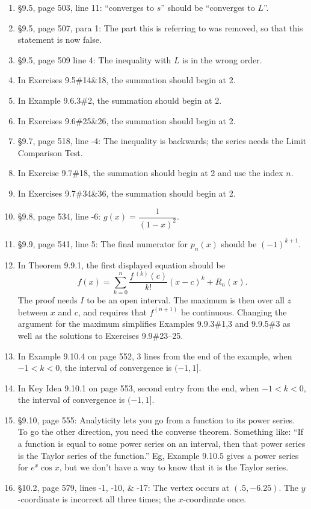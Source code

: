 \documentclass{amsart}
\begin{document}
\begin{enumerate}
\item \S9.5, page 503, line 11: ``converges to $s$'' should be ``converges to $L$''.
\item \S9.5, page 507, para 1: The part this is referring to was removed, so that this statement is now false.
\item \S9.5, page 509 line 4: The inequality with $L$ is in the wrong order.
\item In Exercises 9.5\#14\&18, the summation should begin at 2.
\item In Example 9.6.3\#2, the summation should begin at 2.
\item In Exercises 9.6\#25\&26, the summation should begin at 2.
\item \S9.7, page 518, line -4: The inequality is backwards; the series needs the Limit Comparison Test.
\item In Exercise 9.7\#18, the summation should begin at 2 and use the index $n$.
\item In Exercises 9.7\#34\&36, the summation should begin at 2.
\item \S9.8, page 534, line -6: $g(x)=\dfrac1{(1-x)^2}$.
\item \S9.9, page 541, line 5: The final numerator for $p_n(x)$ should be $(-1)^{k+1}$.
\item In Theorem 9.9.1, the first displayed equation should be
\[f(x) = \sum_{k=0}^n\frac{f\,^{(k)}(c)}{k!}(x-c)^k+R_n(x).\]
The proof needs $I$ to be an open interval.  The maximum is then over all $z$ between $x$ and $c$, and requires that $f^{(n+1)}$ be continuous.  Changing the argument for the maximum simplifies Examples 9.9.3\#1,3 and 9.9.5\#3 as well as the solutions to Exercises 9.9\#23--25.
\item In Example 9.10.4 on page 552, 3 lines from the end of the example, when $-1<k<0$, the interval of convergence is $(-1,1]$.
\item In Key Idea 9.10.1 on page 553, second entry from the end, when $-1<k<0$, the interval of convergence is $(-1,1]$.
\item \S9.10, page 555: Analyticity lets you go from a function to its power series.  To go the other direction, you need the converse theorem.  Something like: ``If a function is equal to some power series on an interval, then that power series is the Taylor series of the function.''  Eg, Example 9.10.5 gives a power series for $e^x\cos x$, but we don't have a way to know that it is the Taylor series.
\item \S10.2, page 579, lines -1, -10, \& -17: The vertex occurs at $(.5,-6.25)$.  The $y$-coordinate is incorrect all three times; the $x$-coordinate once.

\end{enumerate}
\end{document}
